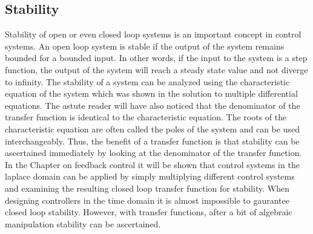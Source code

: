 \subsection{Stability}\label{s:stability}

Stability of open or even closed loop systems is an important concept in control systems. An open loop system is stable if the output of the system remains bounded for a bounded input. In other words, if the input to the system is a step function, the output of the system will reach a steady state value and not diverge to infinity. The stability of a system can be analyzed using the characteristic equation of the system which was shown in the solution to multiple differential equations. The astute reader will have also noticed that the denominator of the transfer function is identical to the characteristic equation. The roots of the characteristic equation are often called the poles of the system and can be used interchangeably. Thus, the benefit of a transfer function is that stability can be ascertained immediately by looking at the denominator of the transfer function. In the Chapter on feedback control it will be shown that control systems in the laplace domain can be applied by simply multiplying different control systems and examining the resulting closed loop transfer function for stability. When designing controllers in the time domain it is almost impossible to gaurantee closed loop stability. However, with transfer functions, after a bit of algebraic manipulation stability can be ascertained. 

